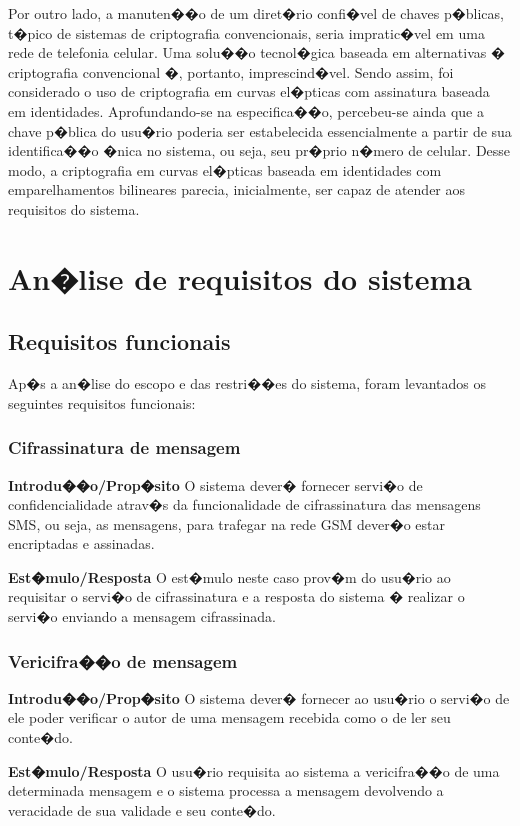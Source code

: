 \documentclass[a4paper,capchap,espacoduplo,normaltoc]{abntepusp}
\begin{document}
Por outro lado, a manuten��o de um diret�rio confi�vel de chaves p�blicas, t�pico de sistemas de criptografia convencionais, seria impratic�vel em uma rede de telefonia celular.  Uma solu��o tecnol�gica baseada em alternativas � criptografia convencional �, portanto, imprescind�vel. Sendo assim, foi considerado o uso de criptografia em curvas el�pticas com assinatura baseada em identidades. Aprofundando-se na especifica��o, percebeu-se ainda que a chave p�blica do usu�rio poderia ser estabelecida essencialmente a partir de sua identifica��o �nica no sistema, ou seja, seu pr�prio n�mero de celular. Desse modo, a criptografia em curvas el�pticas baseada em identidades com emparelhamentos bilineares parecia, inicialmente, ser capaz de atender aos requisitos do sistema.

\chapter{An�lise de requisitos do sistema}

\section{Requisitos funcionais}

 Ap�s a an�lise do escopo e das restri��es do sistema, foram levantados os seguintes requisitos funcionais:
 
\subsection{Cifrassinatura de mensagem}
\textbf{Introdu��o/Prop�sito} O sistema dever� fornecer servi�o de confidencialidade atrav�s da funcionalidade de cifrassinatura das mensagens SMS, ou seja, as mensagens, para trafegar na rede GSM dever�o estar encriptadas e assinadas.

\textbf{Est�mulo/Resposta} O est�mulo neste caso prov�m do usu�rio ao requisitar o servi�o de cifrassinatura e a resposta do sistema � realizar o servi�o enviando a mensagem cifrassinada.

\subsection{Vericifra��o de mensagem}
\textbf{Introdu��o/Prop�sito} O sistema dever� fornecer ao usu�rio o servi�o de ele poder verificar o autor de uma mensagem recebida como o de ler seu conte�do.

\textbf{Est�mulo/Resposta} O usu�rio requisita ao sistema a vericifra��o de uma determinada mensagem e o sistema processa a mensagem devolvendo a veracidade de sua validade e seu conte�do.
\end{document}
